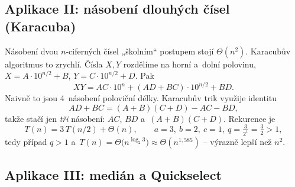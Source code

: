 \documentclass[11pt,a4paper]{article}
\begin{document}
\subsection{Aplikace II: násobení dlouhých čísel (Karacuba)}

Násobení dvou $n$-ciferných čísel „školním`` postupem stojí $\Theta(n^2)$. Karacubův algoritmus to zrychlí. Čísla $X,Y$ rozdělíme na horní a~dolní polovinu, $X=A\cdot10^{n/2}+B$, $Y=C\cdot10^{n/2}+D$. Pak
\[
XY = AC\cdot10^{n} + (AD+BC)\cdot10^{n/2} + BD .
\]
Naivně to jsou 4~násobení poloviční délky. Karacubův trik využije identitu
\[
AD+BC = (A+B)(C+D)-AC-BD,
\]
takže stačí jen \emph{tři} násobení: $AC$, $BD$ a~$(A+B)(C+D)$. Rekurence je
\[
T(n)=3\,T(n/2)+\Theta(n),\qquad a=3,\ b=2,\ c=1,\ q=\tfrac{3}{2^1}=\tfrac32>1,
\]
tedy případ $q>1$ a~$T(n)=\Theta\!\big(n^{\log_2 3}\big)\approx\Theta(n^{1{,}585})$ -- výrazně lepší než $n^2$.

\subsection{Aplikace III: medián a Quickselect}
\end{document}
